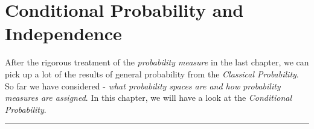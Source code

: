 \chapter{Conditional Probability and Independence}

After the rigorous treatment of the \textit{probability measure} in the last chapter, we can pick up a lot of the results of general probability from the \textit{Classical Probability}. So far we have considered - \textit{what probability spaces are and how probability measures are assigned}. In this chapter, we will have a look at the \textit{Conditional Probability}.





\vspace{30pt}
\hrule